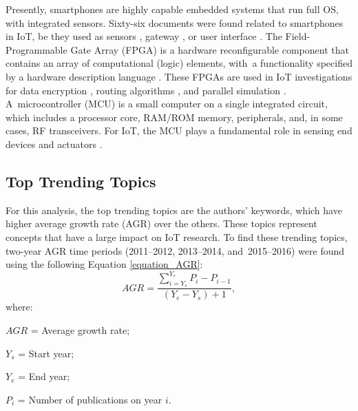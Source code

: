 \documentclass[symmetry,article,accept,moreauthors,pdftex10pt,a4paper]{mdpi}
\begin{document}
Presently, smartphones are highly capable embedded systems that run full OS, with integrated sensors. Sixty-six documents were found related to smartphones in IoT, be they used as sensors \cite{Behringer2016179,Kothandaraman2016661}, gateway \cite{Seol2015133,Gupta2016416,Pereira2016}, or user interface \cite{Mayer201446,Lee20163777}. The Field-Programmable Gate Array (FPGA) is a hardware reconfigurable component that contains an array of computational (logic) elements, with~a functionality specified by a hardware description language \cite{Compton2002171}. These FPGAs are used in IoT investigations for data encryption \cite{Prasetyo201475,Rao20152212,Prathiba2016}, routing algorithms \cite{Qu2012124}, and parallel simulation \cite{Wehner2014}. A~microcontroller (MCU) is a small computer on a single integrated circuit, which includes a processor core, RAM/ROM memory, peripherals, and, in some cases, RF transceivers. For IoT, the MCU plays a fundamental role in sensing end devices \cite{Lee2016155,Suresh201517163,Lim201690} and actuators \cite{Sushmitha201619874}.


\subsection{Top Trending Topics}

For this analysis, the top trending topics are the authors' keywords, which have higher average growth rate (AGR) over the others. These topics represent concepts that have a large impact on IoT research. To find these trending topics, two-year AGR time periods (2011--2012, 2013--2014, and~2015--2016) were found using the following Equation \eqref{equation_AGR}:
\begin{equation}
AGR = \frac{\sum\limits_{i = Y_s}^{Y_e}P_i - P_{i-1}}{(Y_e - Y_s)+1},  
\label{equation_AGR}
\end{equation}
where:

$AGR$ = Average growth rate;
	
	$Y_s$ = Start year;
	
	$Y_e$ = End year;
	
	$P_i$ = Number of publications on year $i.$
\newline
\end{document}
